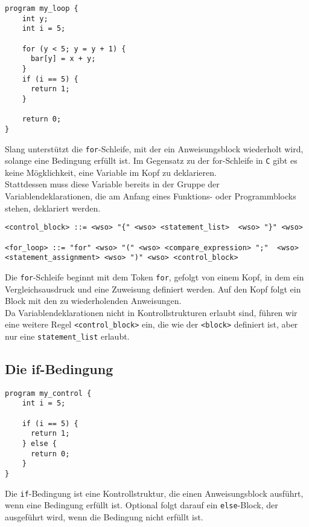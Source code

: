 \begin{lstlisting}[caption={Slang Beispiel for-Schleife}]
program my_loop {
    int y;
    int i = 5;
    
    for (y < 5; y = y + 1) {
      bar[y] = x + y;
    }
    if (i == 5) {
      return 1;
    }

    return 0;
}
\end{lstlisting}

Slang unterstützt die \texttt{for}-Schleife, mit der ein Anweisungsblock wiederholt wird, solange eine Bedingung erfüllt ist.
Im Gegensatz zu der for-Schleife in \texttt{C} gibt es keine Mögklichkeit, eine Variable im Kopf zu deklarieren.\\
Stattdessen muss diese Variable bereits in der Gruppe der Variablendeklarationen, die am Anfang eines Funktions- oder Programmblocks stehen, deklariert werden.

\begin{lstlisting}[caption={Grammatikdefinition for-Schleife}]
<control_block> ::= <wso> "{" <wso> <statement_list>  <wso> "}" <wso>

<for_loop> ::= "for" <wso> "(" <wso> <compare_expression> ";"  <wso> <statement_assignment> <wso> ")" <wso> <control_block>
\end{lstlisting}

Die \texttt{for}-Schleife beginnt mit dem Token \texttt{for}, gefolgt von einem Kopf, in dem ein Vergleichsausdruck und eine Zuweisung definiert werden.
Auf den Kopf folgt ein Block mit den zu wiederholenden Anweisungen.\\

Da Variablendeklarationen nicht in Kontrollstrukturen erlaubt sind, führen wir eine weitere Regel \texttt{<control\_block>} ein, die wie der \texttt{<block>} definiert ist, aber nur eine \texttt{statement\_list} erlaubt.\\

\pagebreak

\subsection{Die if-Bedingung}

\begin{lstlisting}[caption={Slang Beispiel if-Bedingung}]
program my_control {
    int i = 5;
    
    if (i == 5) {
      return 1;
    } else {
      return 0;
    }
}
\end{lstlisting}

Die \texttt{if}-Bedingung ist eine Kontrollstruktur, die einen Anweisungsblock ausführt, wenn eine Bedingung erfüllt ist.
Optional folgt darauf ein \texttt{else}-Block, der ausgeführt wird, wenn die Bedingung nicht erfüllt ist.

